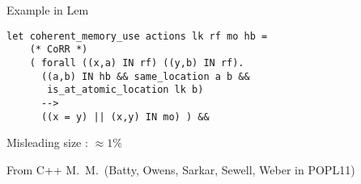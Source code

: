 \documentclass[pdf,nototal]{prosper}
\begin{document}
\begin{slide}{Example in Lem}
{\small
\begin{verbatim}
let coherent_memory_use actions lk rf mo hb =
    (* CoRR *)
    ( forall ((x,a) IN rf) ((y,b) IN rf).
      ((a,b) IN hb && same_location a b && 
       is_at_atomic_location lk b) 
      -->
      ((x = y) || (x,y) IN mo) ) &&
\end{verbatim}}

\vspace{24pt}

{\color{dr} Misleading size : $\approx 1\%$}

\vspace{24pt}

{\footnotesize
From C++ M.\ M.\ (Batty, Owens, Sarkar, Sewell, Weber in POPL11)\\
}
\end{slide}
%
%
\end{document}
